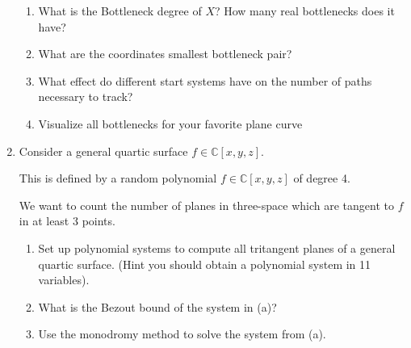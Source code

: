\documentclass[11pt,reqno]{amsart}
\theoremstyle{definition}
\theoremstyle{remark}
\numberwithin{equation}{section}
\begin{document}
\begin{enumerate}
\begin{enumerate}
\item What is the Bottleneck degree of $X$? How many real bottlenecks does it have?

\item What are the coordinates smallest bottleneck pair?

\item What effect do different start systems have on the number of paths necessary to track?

\item Visualize all bottlenecks for your favorite plane curve
\end{enumerate}

\item Consider a general quartic surface $f \in \mathbb{C}[x,y,z]$. 

This is defined by a random polynomial $f\in \mathbb{C}[x,y,z]$ of degree 4.

We want to count the number of planes in three-space which are tangent to $f$ in at least 3 points.
\begin{enumerate}
\item Set up polynomial systems to compute all tritangent planes of a general quartic surface. (Hint you should obtain a polynomial system in 11 variables).

\item What is the Bezout bound of the system in (a)?

\item Use the monodromy method to solve the system from (a).
\end{enumerate}

\end{enumerate}
\end{document}
